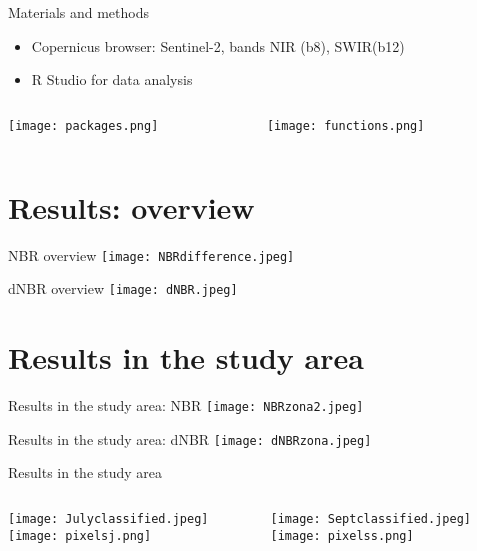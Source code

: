 \documentclass{beamer}
\begin{document}
\begin{frame}{Materials and methods}
\begin{itemize}
    \item Copernicus browser: Sentinel-2, bands NIR (b8), SWIR(b12)
    \item R Studio for data analysis
\end{itemize}
\begin{columns}
    \begin{column}{0.5\textwidth}
        \texttt{[image: packages.png]}
    \end{column}
    \begin{column}{0.5\textwidth}
    \texttt{[image: functions.png]}
    \end{column}
\end{columns}
\end{frame}

\section{Results: overview}
\begin{frame}{NBR overview}
\texttt{[image: NBRdifference.jpeg]}
\end{frame}

\begin{frame}{dNBR overview}
  \texttt{[image: dNBR.jpeg]}  
\end{frame}

\section{Results in the study area}
\begin{frame}{Results in the study area: NBR}
\texttt{[image: NBRzona2.jpeg]}
\end{frame}

\begin{frame}{Results in the study area: dNBR}
\texttt{[image: dNBRzona.jpeg]}
\end{frame}

\begin{frame}{Results in the study area}
\begin{columns}
    \begin{column}{0.5\textwidth}
        \texttt{[image: Julyclassified.jpeg]}
        \texttt{[image: pixelsj.png]}
    \end{column}
    \begin{column}{0.5\textwidth}
    \texttt{[image: Septclassified.jpeg]}
    \texttt{[image: pixelss.png]}
    \end{column}
\end{columns}
\end{frame}
\end{document}
